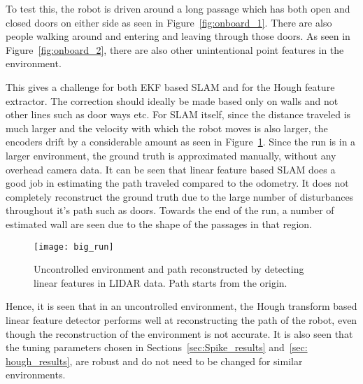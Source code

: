 To test this, the robot is driven around a long passage which has both open and closed doors on either side as seen in Figure~\ref{fig:onboard_1}. There are also people walking around and entering and leaving through those doors. As seen in Figure~\ref{fig:onboard_2}, there are also other unintentional point features in the environment. 

This gives a challenge for both EKF based SLAM and for the Hough feature extractor. The correction should ideally be made based only on walls and not other lines such as door ways etc. For SLAM itself, since the distance traveled is much larger and the velocity with which the robot moves is also larger, the encoders drift by a considerable amount as seen in Figure~\ref{fig:big_run}. Since the run is in a larger environment, the ground truth is approximated manually, without any overhead camera data. It can be seen that linear feature based SLAM does a good job in estimating the path traveled compared to the odometry. It does not completely reconstruct the ground truth due to the large number of disturbances throughout it's path such as doors. Towards the end of the run, a number of estimated wall are seen due to the shape of the passages in that region. 

\begin{figure}
\centering
\texttt{[image: big\_run]}
\caption{Uncontrolled environment and path reconstructed by detecting linear features in LIDAR data. Path starts from the origin.}
\label{fig:big_run}
\end{figure}

Hence, it is seen that in an uncontrolled environment, the Hough transform based linear feature detector performs well at reconstructing the path of the robot, even though the reconstruction of the environment is not accurate. It is also seen that the tuning parameters chosen in Sections~\ref{sec:Spike_results} and~\ref{sec: hough_results}, are robust and do not need to be changed for similar environments. 
